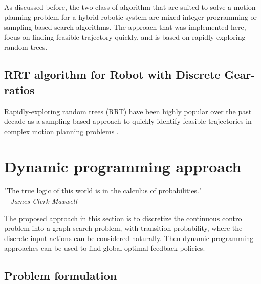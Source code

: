 As discussed before, the two class of algorithm that are suited to solve a motion planning problem for a hybrid robotic system are mixed-integer programming or sampling-based search algorithms. The approach that was implemented here, focus on finding feasible trajectory quickly, and is based on rapidly-exploring random trees.

\subsection{RRT algorithm for Robot with Discrete Gear-ratios}

Rapidly-exploring random trees (RRT) have been highly popular over the past decade as a sampling-based approach to quickly identify feasible trajectories in complex motion planning problems \cite{lavalle_rapidly-exploring_1998}\cite{lavalle_planning_2006}.







\newpage

\section{Dynamic programming approach}
\label{sec:DynamicProgrammingAproach}

\begin{flushright}
\small"The true logic of this world is in the calculus of probabilities." \\ \emph{-- James Clerk Maxwell}
\end{flushright}

The proposed approach in this section is to discretize the continuous control problem into a graph search problem, with transition probability, where the discrete input actions can be considered naturally. Then dynamic programming approaches can be used to find global optimal feedback policies. 


\subsection{Problem formulation}

